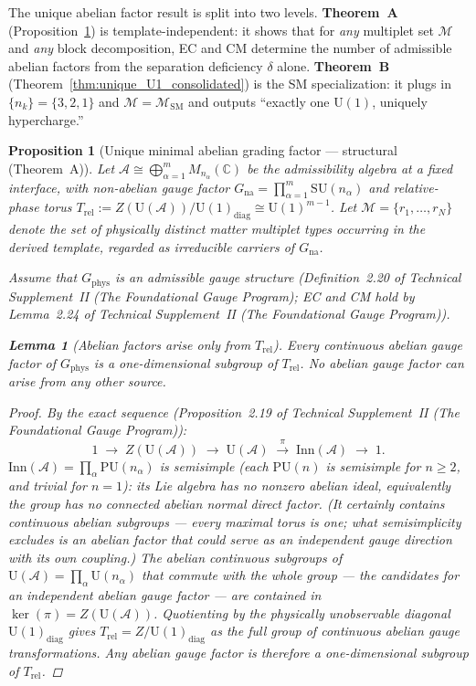 \documentclass[11pt]{article}
\newtheorem{lemma}[theorem]{Lemma}
\newtheorem{proposition}[theorem]{Proposition}
\theoremstyle{definition}
\newcommand{\SU}{\mathrm{SU}}
\newcommand{\U}{\mathrm{U}}
\newcommand{\TSII}{Technical Supplement~II (\emph{The Foundational Gauge Program})}
\begin{document}
\smallskip\noindent The unique abelian factor result is split into two
levels.  \textbf{Theorem~A} (Proposition~\ref{prop:unique_U1}) is
template-independent: it shows that for \emph{any} multiplet set
$\mathcal{M}$ and \emph{any} block decomposition, EC and CM determine
the number of admissible abelian factors from the separation deficiency
$\delta$ alone.  \textbf{Theorem~B}
(Theorem~\ref{thm:unique_U1_consolidated}) is the SM specialization:
it plugs in $\{n_k\} = \{3, 2, 1\}$ and $\mathcal{M} =
\mathcal{M}_{\mathrm{SM}}$ and outputs ``exactly one $\U(1)$,
uniquely hypercharge.''

\begin{proposition}[Unique minimal abelian grading factor ---
structural (Theorem~A)]\label{prop:unique_U1}
Let
$\mathcal{A} \cong \bigoplus_{\alpha=1}^{m} M_{n_\alpha}(\mathbb{C})$
be the admissibility algebra at a fixed interface, with non-abelian gauge
factor
$G_{\mathrm{na}} = \prod_{\alpha=1}^{m} \SU(n_\alpha)$
and relative-phase torus
$T_{\mathrm{rel}} := Z(\mathrm{U}(\mathcal{A})) / \mathrm{U}(1)_{\mathrm{diag}}
\cong \mathrm{U}(1)^{m-1}$.
Let $\mathcal{M} = \{r_1, \ldots, r_N\}$ denote the set of physically
distinct matter multiplet types occurring in the derived template,
regarded as irreducible carriers of $G_{\mathrm{na}}$.

Assume that $G_{\mathrm{phys}}$ is an admissible gauge structure
(Definition~2.20 of \TSII{}; EC and CM hold by
Lemma~2.24 of \TSII{}).

\begin{lemma}[Abelian factors arise only from $T_{\mathrm{rel}}$]
\label{lem:abelian_source}
Every continuous abelian gauge factor of $G_{\mathrm{phys}}$ is a
one-dimensional subgroup of $T_{\mathrm{rel}}$.  No abelian gauge
factor can arise from any other source.
\end{lemma}

\begin{proof}
By the exact sequence (Proposition~2.19 of \TSII{}):
\[
  1 \;\to\; Z(\mathrm{U}(\mathcal{A}))
  \;\to\; \mathrm{U}(\mathcal{A})
  \;\xrightarrow{\;\pi\;}\;
  \mathrm{Inn}(\mathcal{A}) \;\to\; 1.
\]
$\mathrm{Inn}(\mathcal{A}) = \prod_\alpha \mathrm{PU}(n_\alpha)$ is
semisimple (each $\mathrm{PU}(n)$ is semisimple for $n \ge 2$, and
trivial for $n = 1$): its Lie algebra has no nonzero abelian
\emph{ideal}, equivalently the group has no connected abelian
\emph{normal direct factor}.  (It certainly contains continuous
abelian subgroups --- every maximal torus is one; what semisimplicity
excludes is an abelian factor that could serve as an independent gauge
direction with its own coupling.)  The abelian continuous subgroups of
$\mathrm{U}(\mathcal{A}) = \prod_\alpha \mathrm{U}(n_\alpha)$ that
commute with the whole group --- the candidates for an independent
abelian gauge factor --- are contained in
$\ker(\pi) = Z(\mathrm{U}(\mathcal{A}))$.
Quotienting by the physically unobservable diagonal
$\mathrm{U}(1)_{\mathrm{diag}}$ gives
$T_{\mathrm{rel}} = Z / \mathrm{U}(1)_{\mathrm{diag}}$ as the full
group of continuous abelian gauge transformations.  Any abelian gauge
factor is therefore a one-dimensional subgroup of $T_{\mathrm{rel}}$.


\end{proof}
\end{proposition}
\end{document}
